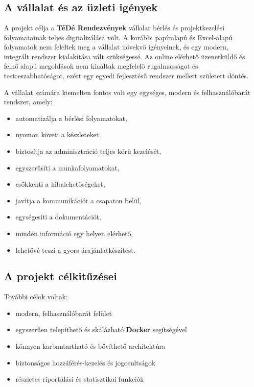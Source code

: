 \chapter{\projectoverview}
\section{A vállalat és az üzleti igények}

A projekt célja a \textbf{TéDé Rendezvények} vállalat bérlés és projektkezelési folyamatainak teljes digitalizálása volt. 
A korábbi papíralapú és Excel-alapú folyamatok nem feleltek meg a vállalat növekvő igényeinek,
és egy modern, integrált rendszer kialakítása vált szükségessé. Az online elérhető üzenetküldő és felhő alapú megoldások
nem kínáltak megfelelő rugalmasságot és testreszabhatóságot, ezért egy egyedi fejlesztésű rendszer mellett született döntés.

A vállalat számára kiemelten fontos volt egy egységes, modern és felhasználóbarát rendszer, amely:
\begin{itemize}
    \item automatizálja a bérlési folyamatokat,
    \item nyomon követi a készleteket,
    \item biztosítja az adminisztráció teljes körű kezelését,
    \item egyszerűsíti a munkafolyamatokat,
    \item csökkenti a hibalehetőségeket,
    \item javítja a kommunikációt a csapaton belül,
    \item egységesíti a dokumentációt,
    \item minden információ egy helyen elérhető,
    \item lehetővé teszi a gyors árajánlatkészítést.
\end{itemize}

\section{A projekt célkitűzései}

További célok voltak:
\begin{itemize}
    \item modern, felhasználóbarát felület
    \item egyszerűen telepíthető és skálázható \textbf{Docker} segítségével
    \item könnyen karbantartható és bővíthető architektúra
    \item biztonságos hozzáférés-kezelés és jogosultságok
    \item részletes riportálási és statisztikai funkciók
\end{itemize}

